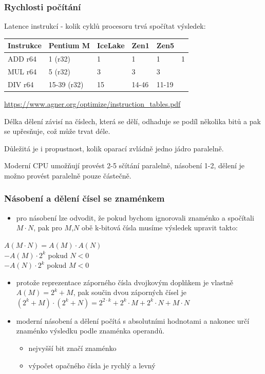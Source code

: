 \documentclass{beamer}
\begin{document}
\begin{frame}
\frametitle{Rychlosti počítání}

Latence instrukcí - kolik cyklů procesoru trvá spočítat výsledek:

\begin{tabular}{l|l|l|l|l}
\textbf{Instrukce} & \textbf{Pentium M} & \textbf{IceLake} & \textbf{Zen1} & \textbf{Zen5}\\
\hline
ADD r64 & 1 (r32) & 1 & 1 & 1 & 1\\ \hline
MUL r64 & 5 (r32)& 3 &  3 & 3\\ \hline
DIV r64 & 15-39 (r32) & 15 & 14-46 & 11-19\\ 
\end{tabular}

\url{https://www.agner.org/optimize/instruction_tables.pdf}


Délka dělení závisí na číslech, která se dělí, odhaduje se podíl několika bitů a pak se upřesňuje, což může trvat déle.

Důležitá je i propustnost, kolik oparací zvládně jedno jádro paralelně. 

Moderní CPU umožňují provést 2-5 sčítání paralelně, násobení 1-2, dělení je možno provést paralelně pouze částečně.

\end{frame}



\begin{frame}
\frametitle{Násobení a dělení čísel se znaménkem}

\begin{itemize}
\item pro násobení lze odvodit, že pokud bychom ignorovali znaménko a spočítali $M\cdot N$, pak pro $M$,$N$ obě k-bitová čísla musíme výsledek upravit takto:
\end{itemize}
$A(M\cdot N) = A(M) \cdot A(N)$\\
\phantom{$A(M\cdot N)$ }$-A(M) \cdot 2^k$ \phantom{xxxxx} pokud $N<0$\\
\phantom{$A(M\cdot N)$ }$-A(N) \cdot 2^k$ \phantom{xxxxx} pokud $M<0$
\begin{itemize}
\item protože reprezentace záporného čísla dvojkovým doplňkem je vlastně $A(M) = 2^k+M$, pak součin dvou záporných čísel je $(2^k+M)\cdot (2^k+N) = 2^{2\cdot k}+2^k \cdot M + 2^k \cdot N + M \cdot N$
\end{itemize}
\begin{itemize}
\item moderní násobení a dělení počítá s absolutními hodnotami a nakonec určí znaménko výsledku podle znaménka operandů.
\begin{itemize}
\item nejvyšší bit značí znaménko
\item výpočet opačného čísla je rychlý a levný
\end{itemize}
\end{itemize}
\end{frame}
\end{document}
